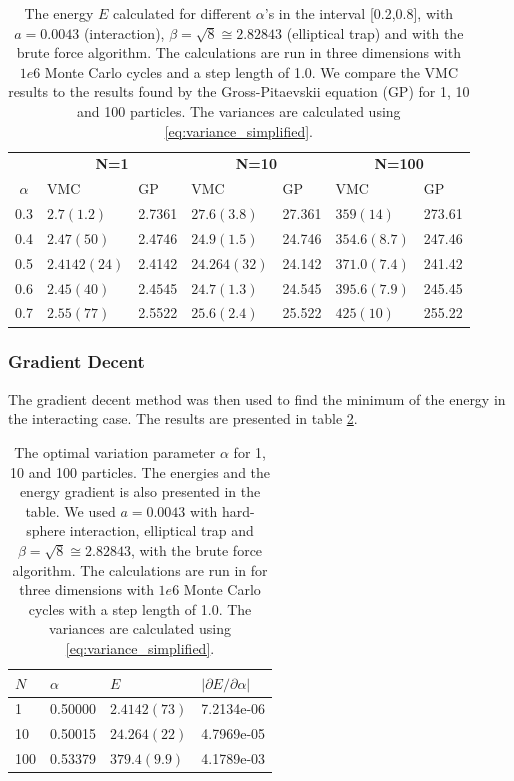 \documentclass[norsk,a4paper,12pt]{article}
\begin{document}
\begin{table} [H]
	\centering
	\caption{The energy $E$ calculated for different $\alpha$'s in the interval [0.2,0.8], with $a=0.0043$ (interaction), $\beta=\sqrt{8}\cong2.82843$ (elliptical trap) and with the brute force algorithm. The calculations are run in three dimensions with $1e6$ Monte Carlo cycles and a step length of 1.0. We compare the VMC results to the results found by the Gross-Pitaevskii equation (GP) for 1, 10 and 100 particles. The variances are calculated using \ref{eq:variance_simplified}.\vspace{2mm}}
	\begin{tabularx}{\textwidth}{c|XXXXXX} \hline\hline
		\label{tab:EL_calc_repulsive_pot}
		& \multicolumn{2}{c}{\textbf{N=1}} & \multicolumn{2}{c}{\textbf{N=10}} & \multicolumn{2}{c}{\textbf{N=100}} \\
		$\alpha$ & VMC & GP & VMC & GP & VMC & GP  \\ \hline
		0.3 & $2.7(1.2)$ & 2.7361 & $27.6(3.8)$  & 27.361 & $359(14)$ & 273.61\\
		0.4 & $2.47(50)$ & 2.4746 & $24.9(1.5)$ & 24.746 & $354.6(8.7)$ & 247.46\\ 
		0.5 & $2.4142(24)$ & 2.4142 & $24.264(32) $ & 24.142 & $371.0(7.4)$ & 241.42\\ 
		0.6 & $2.45(40) $  & 2.4545 & $24.7(1.3)$ & 24.545 & $395.6(7.9)$ & 245.45\\ 
		0.7 & $2.55(77) $ & 2.5522 & $25.6(2.4)$ & 25.522 & $425(10)$ & 255.22\\  \hline
	\end{tabularx}
\end{table}

\subsubsection{Gradient Decent} \label{sec:gd}
The gradient decent method was then used to find the minimum of the energy in the interacting case. The results are presented in table \ref{tab:EL_calc_gradientdecent}.

\begin{table} [H]
	\centering
	\caption{The optimal variation parameter $\alpha$ for 1, 10 and 100 particles. The energies and the energy gradient is also presented in the table. We used $a=0.0043$  with hard-sphere interaction,  elliptical trap and $\beta=\sqrt{8}\cong2.82843$, with the brute force algorithm. The calculations are run in for three dimensions with $1e6$ Monte Carlo cycles with a step length of 1.0. The variances are calculated using \ref{eq:variance_simplified}. \vspace{2mm}}
	\begin{tabularx}{\textwidth}{X|XXX} \hline\hline
		\label{tab:EL_calc_gradientdecent}
		$N$ & $\alpha $ & $E$  & $|\partial E/\partial \alpha|$   \\ \hline
		1   & 0.50000  & $2.4142(73)$  &  7.2134e-06 \\
		10  & 0.50015  & $24.264(22)$  &  4.7969e-05 \\ 
		100 & 0.53379  & $379.4(9.9)$  &  4.1789e-03 \\ \hline
	\end{tabularx}
\end{table}
\end{document}
